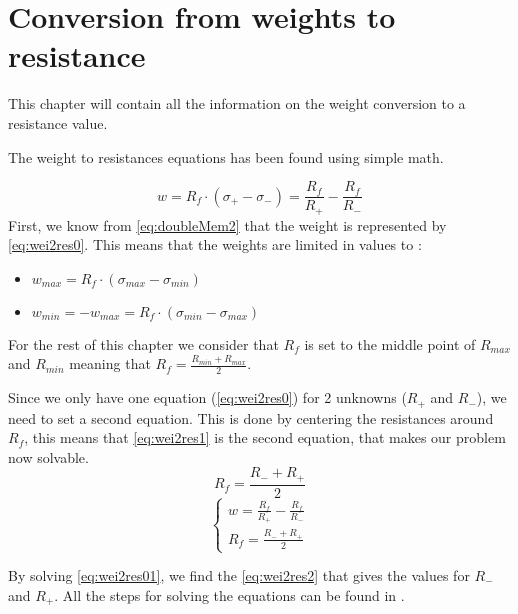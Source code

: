 \section{Conversion from weights to resistance}
\label{sec:wei2res}

This chapter will contain all the information on the weight conversion to a resistance value.

The weight to resistances equations has been found using simple math.

\begin{equation}
  \label{eq:wei2res0}
  w=R_f\cdot(\sigma_+-\sigma_-)=\frac{R_f}{R_+}-\frac{R_f}{R_-}
\end{equation}
First, we know from \cref{eq:doubleMem2} that the weight is represented by \cref{eq:wei2res0}. This means that the weights are limited in values to :

\begin{itemize}
  \item $w_{max}=R_f\cdot(\sigma_{max}-\sigma_{min})$
  \item $w_{min}=-w_{max}=R_f\cdot(\sigma_{min}-\sigma_{max})$
\end{itemize}

For the rest of this chapter we consider that $R_f$ is set to the middle point of $R_{max}$ and $R_{min}$ meaning that $R_f=\frac{R_{min}+R_{max}}{2}$.

Since we only have one equation (\cref{eq:wei2res0}) for 2 unknowns ($R_+$ and $R_-$), we need to set a second equation. This is done by centering the resistances around $R_f$, this means that \cref{eq:wei2res1} is the second equation, that makes our problem now solvable.
\begin{equation}
  \label{eq:wei2res1}
  R_f=\frac{R_-+R_+}{2}
\end{equation}
\begin{equation}
  \label{eq:wei2res01}
  \begin{cases}
    w=\frac{R_f}{R_+}-\frac{R_f}{R_-}\\
    R_f=\frac{R_-+R_+}{2}
  \end{cases}
\end{equation}

By solving \cref{eq:wei2res01}, we find the \cref{eq:wei2res2} that gives the values for $R_-$ and $R_+$. All the steps for solving the equations can be found in .%

